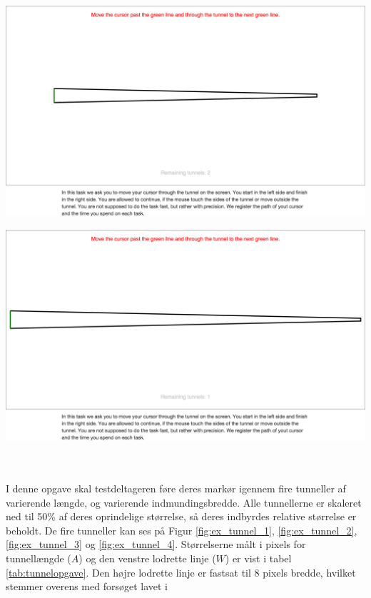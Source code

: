 \begin{minipage}{\linewidth}
\begin{minipage}{\textwidth}
		\label{fig:ex_tunnel_2}
	\end{minipage}
	\begin{minipage}{\textwidth}
		\centering
		\includegraphics[width=\textwidth, trim = .5cm 21cm .5cm 15cm, clip]{images/screenshots/ex_step_4_tunnel_3}
		\label{fig:ex_tunnel_3}
	\end{minipage}
	\begin{minipage}{\textwidth}
		\centering
		\includegraphics[width=\textwidth, trim = .5cm 20cm .5cm 15cm, clip]{images/screenshots/ex_step_4_tunnel_4}
		\label{fig:ex_tunnel_4}
	\end{minipage}
\end{minipage}\\\\
I denne opgave skal testdeltageren føre deres markør igennem fire tunneller af varierende længde, og varierende indmundingsbredde. Alle tunnellerne er skaleret ned til 50\% af deres oprindelige størrelse, så deres indbyrdes relative størrelse er beholdt. De fire tunneller kan ses på Figur \ref{fig:ex_tunnel_1}, \ref{fig:ex_tunnel_2}, \ref{fig:ex_tunnel_3} og \ref{fig:ex_tunnel_4}.  Størrelserne målt i pixels for tunnellængde ($A$) og den venstre lodrette linje ($W$) er vist i tabel \ref{tab:tunnelopgave}. Den højre lodrette linje er fastsat til 8 pixels bredde, hvilket stemmer overens med forsøget lavet i \cite{accot1997}
